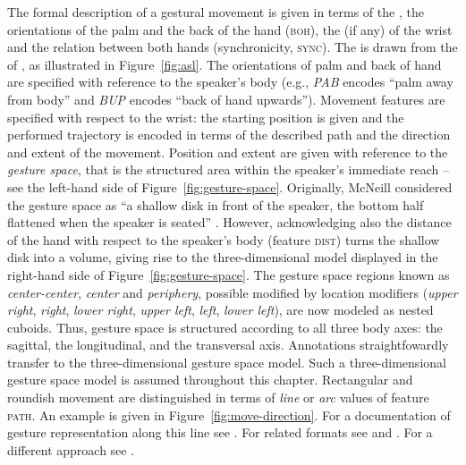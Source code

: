 \documentclass[output=paper]{langsci/langscibook}
\begin{document}
The formal description of a gestural movement is given in terms of the ,  the orientations of the palm  and the back of the hand (\textsc{boh}),  the  (if any) of the wrist  and the relation between both hands (synchronicity, \textsc{sync}). 
%
The  is drawn from the  of , as illustrated in Figure~\ref{fig:asl}.
%
The orientations  of palm and back of hand are specified with reference to the speaker's body (e.g., \textit{PAB} encodes \enquote{palm away from body} and \textit{BUP} encodes \enquote{back of hand upwards}). 
%
Movement features are specified with respect to the wrist: the starting position  is given and the performed trajectory is encoded in terms of the described path  and the direction  and extent  of the movement.
%
Position and extent are given with reference to the \emph{gesture space}, that is the structured area within the speaker's immediate reach \citep[--89]{McNeill:1992} -- see the left-hand side of Figure~\ref{fig:gesture-space}. 
%
Originally, McNeill considered the gesture space as \enquote{a shallow disk in front of the speaker, the bottom half flattened when the speaker is seated} \citep[]{McNeill:1992}. 
%
However, acknowledging also the distance of the hand with respect to the speaker's body (feature \textsc{dist}) turns the shallow disk into a volume, giving rise to the three-dimensional model displayed in the right-hand side of Figure~\ref{fig:gesture-space}.
%
The gesture space regions known as \emph{center-center}, \emph{center} and \emph{periphery}, possible modified by location modifiers (\emph{upper right}, \emph{right}, \emph{lower right}, \emph{upper left}, \emph{left}, \emph{lower left}), are now modeled as nested cuboids. 
%
Thus, gesture space is structured according to all three body axes: the sagittal, the longitudinal, and the transversal axis.
%
Annotations straightfowardly transfer to the three-dimensional gesture space model.
%
Such a three-dimensional gesture space model is assumed throughout this chapter.
%
Rectangular and roundish movement are distinguished in terms of \textit{line}  or \textit{arc}  values of feature \textsc{path}.
%
An example is given in Figure~\ref{fig:move-direction}.
%
For a documentation of gesture representation along this line see \citet{FIGURE:annotation}.
%
For related formats see \citet{Martell:2002} and \citet{Gibbon:et:al:2003}.
%
For a different approach see \citet{Lausberg:Sloetjes:2009}.
\end{document}
